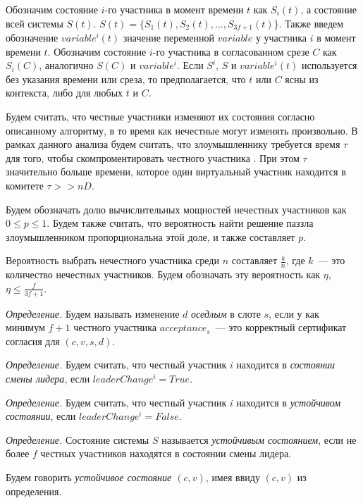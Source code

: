 Обозначим состояние $i$-го участника в момент времени $t$ как $S_i(t)$, а состояние всей системы $S(t)$. 
$S(t)=\{S_1(t), S_2(t),..., S_{3f+1}(t)\}$. Также введем обозначение $variable^i(t)$ значение переменной $variable$ у участника $i$ в момент времени $t$.
Обозначим состояние $i$-го участника в согласованном срезе $C$ как $S_i(C)$, аналогично $S(C)$ и $variable^i$.
Если $S^i$, $S$ и $variable^i(t)$ используется без указания времени или среза, то предполагается, что $t$ или $C$ ясны из контекста, либо для любых $t$ и $C$.

Будем считать, что честные участники изменяют их состояния согласно описанному алгоритму, в то время как нечестные могут изменять произвольно.
В рамках данного анализа будем считать, что злоумышленнику требуется время $\tau$ для того, чтобы скомпроментировать честного участника \cite{hybrid-consensus}. При этом $\tau$ значительно больше времени, которое один виртуальный участник находится в комитете $\tau >> nD$.

Будем обозначать долю вычислительных мощностей нечестных участников как $0 \le p \le 1$. Будем также считать, что вероятность найти решение паззла злоумышленником пропорциональна этой доле, и также составляет $p$. 

Вероятность выбрать нечестного участника среди $n$ составляет $\frac{k}{n}$, где $k$~--- это количество нечестных участников. Будем обозначать эту вероятность как $\eta$, $\eta \le \frac{f}{3f+1}$.
\vspace{10pt}

\textit{Определение.} Будем называть изменение $d$ \textit{оседлым} в слоте $s$, если у как минимум $f+1$ честного участника $acceptance_s$~--- это корректный сертификат согласия для $(c, v, s, d)$.

\textit{Определение.} Будем считать, что честный участник $i$ находится в \textit{состоянии смены лидера}, если $leaderChange^i = True$.

\textit{Определение.} Будем считать, что честный участник $i$ находится в \textit{устойчивом состоянии}, если $leaderChange^i = False$.

\textit{Определение.} Состояние системы $S$ называется \textit{устойчивым состоянием}, если не более $f$ честных участников находятся в состоянии смены лидера. 

Будем говорить \textit{устойчивое состояние $(c, v)$}, имея ввиду $(c, v)$ из определения.

